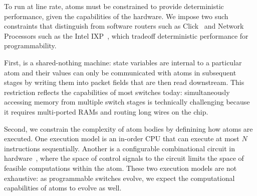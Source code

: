 \smallskip
{} To run at line rate, atoms must
be constrained to provide deterministic performance, given the
capabilities of the hardware. We impose two such constraints that
distinguish \absmachine from software routers such as
Click~\cite{click} and Network Processors such as the Intel
IXP~\cite{ixp4xx}, which tradeoff deterministic performance for
programmability.

First, \absmachine is a shared-nothing machine: state variables are
internal to a particular atom and their values can only be
communicated with atoms in subsequent stages by writing them into
packet fields that are then read downstream.  This restriction
reflects the capabilities of most switches today: simultaneously
accessing memory from multiple switch stages is technically
challenging because it requires multi-ported RAMs and routing long
wires on the chip.


Second, we constrain the complexity of atom bodies by definining how
atoms are executed. One execution model is an in-order CPU that can
execute at most $N$ instructions sequentially. Another is a
configurable combinational circuit in hardware~\cite{dataflow}, where
the space of control signals to the circuit limits the space of
feasible computations within the atom. These two execution models are
not exhaustive: as programmable switches evolve, we expect the
computational capabilities of atoms to evolve as well.

